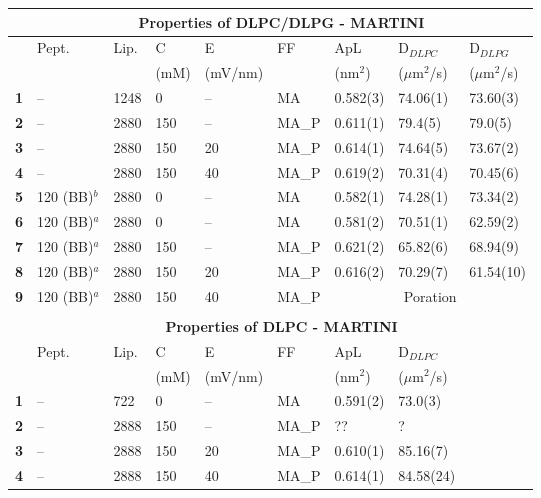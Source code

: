 \begin{figure}
\centering
\vspace{1.5cm}
\scriptsize
 \def\arraystretch{1.6}
\begin{tabular}{lllllllll}
& \multicolumn{8}{c}{\textbf{Properties of DLPC/DLPG - MARTINI}} \\
 \hline
& Pept. & Lip. & C & E & FF & ApL & D$_{DLPC}$ & D$_{DLPG}$ \\
& & & (mM) & (mV/nm) & & (nm$^2$) & ($\mu$m$^2$/s) & ($\mu$m$^2$/s) \\
 \hline
\textbf{1} & -- & 1248 & 0 & -- & MA & 0.582(3) & 74.06(1) & 73.60(3) \\ 
\textbf{2} & -- & 2880 & 150 & -- & MA\_P & 0.611(1) & 79.4(5) & 79.0(5) \\
\textbf{3} & -- & 2880 & 150 & 20 & MA\_P & 0.614(1) & 74.64(5) & 73.67(2) \\
\textbf{4} & -- & 2880 & 150 & 40 & MA\_P & 0.619(2) & 70.31(4) & 70.45(6) \\
 \hline
\textbf{5} & 120 (BB)$^b$ & 2880 & 0 & -- & MA & 0.582(1) & 74.28(1) & 73.34(2) \\
\textbf{6} & 120 (BB)$^a$ & 2880 & 0 & -- & MA & 0.581(2) & 70.51(1) & 62.59(2) \\ 
\textbf{7} & 120 (BB)$^a$ & 2880 & 150 & -- & MA\_P & 0.621(2) & 65.82(6) & 68.94(9) \\
\textbf{8} & 120 (BB)$^a$ & 2880 & 150 & 20 & MA\_P & 0.616(2) & 70.29(7) & 61.54(10) \\
\textbf{9} & 120 (BB)$^a$ & 2880 & 150 & 40 & MA\_P & \multicolumn{3}{c}{Poration} \\
\hline
&\multicolumn{8}{c}{} \\
&\multicolumn{8}{c}{\textbf{Properties of DLPC - MARTINI}} \\
 \hline
& Pept. & Lip. & C & E & FF & ApL & D$_{DLPC}$ & \\
& & & (mM) & (mV/nm) & & (nm$^2$) & ($\mu$m$^2$/s) & \\
 \hline
\textbf{1} & -- & 722 & 0 & -- & MA & 0.591(2) & 73.0(3) \\ 
\textbf{2} & -- & 2888 & 150 & -- & MA\_P & ?? & ? & \\
\textbf{3} & -- & 2888 & 150 & 20 & MA\_P & 0.610(1) & 85.16(7) & \\
\textbf{4} & -- & 2888 & 150 & 40 & MA\_P & 0.614(1) & 84.58(24) & \\

\end{tabular}
\end{figure}
